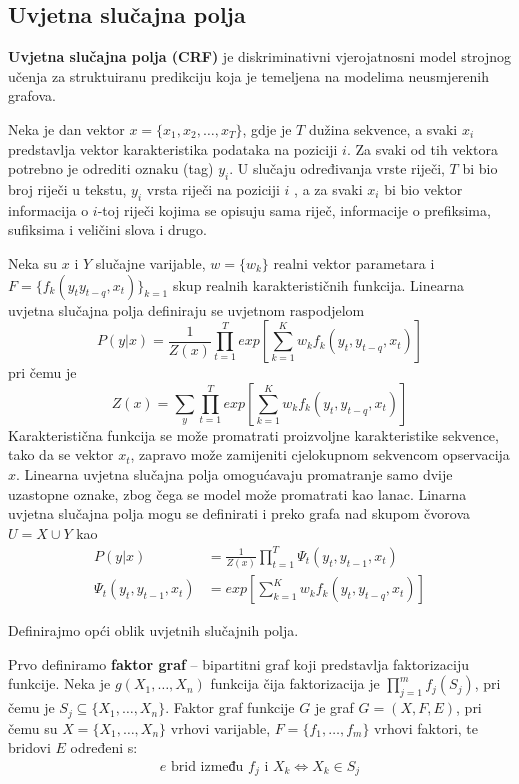 \documentclass[conference]{IEEEtran}
\begin{document}
	
	\subsection{Uvjetna slučajna polja}
		\textbf{Uvjetna slučajna polja (CRF)} je diskriminativni vjerojatnosni model strojnog učenja za struktuiranu predikciju koja je temeljena  na modelima neusmjerenih grafova.
		
		Neka je dan vektor $x = \{ x_1 , x_2, \ldots , x_T\}$, gdje je $T$ dužina sekvence, a svaki $x_i$ predstavlja vektor karakteristika podataka na poziciji $i$. Za svaki od tih vektora potrebno je odrediti oznaku (tag) $y_i$. U slučaju određivanja vrste riječi, $T$ bi bio broj riječi u tekstu, $y_i$ vrsta riječi  na poziciji $i$ , a za svaki $x_i$ bi bio vektor informacija o $i$-toj riječi kojima se opisuju sama riječ, informacije o prefiksima, sufiksima i veličini slova i drugo.
		
		Neka su $x$ i $Y$ slučajne varijable, $ w = \{w_k\} $ realni vektor parametara i $F = \{ f_k(y_t y_{t-q},x_t)\}_{k=1}$ skup realnih karakterističnih funkcija. 
		Linearna uvjetna slučajna polja definiraju se uvjetnom raspodjelom 
		\[
		P(y|x) = \frac{1}{Z(x)} \prod_{t=1}^T exp \left[ \sum_{k=1}^K w_k f_k(y_t,y_{t-q},x_t)\right] 
		\]
		pri čemu je \[ Z(x) = \sum_y \prod_{t=1}^T exp \left[ \sum_{k=1}^K w_k f_k(y_t,y_{t-q},x_t)\right]  \]
		Karakteristična funkcija se može promatrati proizvoljne karakteristike 
		sekvence, tako da se vektor $x_t$, zapravo može zamijeniti cjelokupnom sekvencom opservacija $x$.
		Linearna uvjetna slučajna polja omogućavaju promatranje samo dvije uzastopne oznake, zbog čega se model može promatrati kao lanac. Linarna uvjetna slučajna polja mogu se definirati i preko grafa nad skupom čvorova $U=X \cup Y$ kao  
		\begin{align*}
		P(y|x) &= \frac{1}{Z(x)} \prod _{t=1}^T \Psi_t (y_t, y_{t-1},x_t)  \\
		\Psi_t(y_t,y_{t-1},x_t) &= exp \left[ \sum_{k=1}^K w_k f_k(y_t,y_{t-q},x_t)\right]
		\end{align*}
		
		Definirajmo opći oblik uvjetnih slučajnih polja.
		
		Prvo definiramo \textbf{faktor graf} -- bipartitni graf koji predstavlja faktorizaciju funkcije. Neka je $g(X_1,\ldots, X_n)$ funkcija čija faktorizacija je $\prod_{j=1}^{m}f_j(S_j)$, pri čemu je $S_j \subseteq \{X_1,\ldots, X_n\}$. Faktor graf funkcije $G$ je graf $G = (X,F,E)	$, pri čemu su $X =\{X_1,\ldots, X_n\}$ vrhovi varijable, $F = \{f_1,\ldots,f_m\}$ vrhovi faktori, te bridovi $E$ određeni s:
		\begin{align*}
			e \text{ brid između } f_j \text{ i } X_k \iff X_k \in S_j 
		\end{align*}
		
\end{document}
